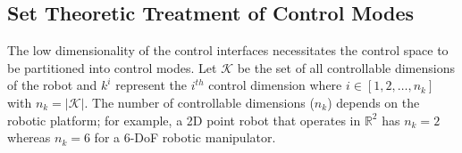\documentclass[conference]{IEEEtran}
\begin{document}
\subsection{Set Theoretic Treatment of Control Modes}\label{ssec:set_modes}
%
The low dimensionality of the control interfaces necessitates the control space to be partitioned into control modes.
Let $\mathcal{K}$ be the set of all controllable dimensions of the robot and $k^i$ represent the $i^{th}$ control dimension where $i \in [1,2,\dots,n_k]$ with $n_k = \vert\mathcal{K}\vert$. The number of controllable dimensions ($n_k$) depends on the robotic platform; for example, a 2D point robot that operates in $\mathbb{R}^2$ has $n_k = 2$ whereas $n_k =6$ for a 6-DoF robotic manipulator. 
\end{document}
